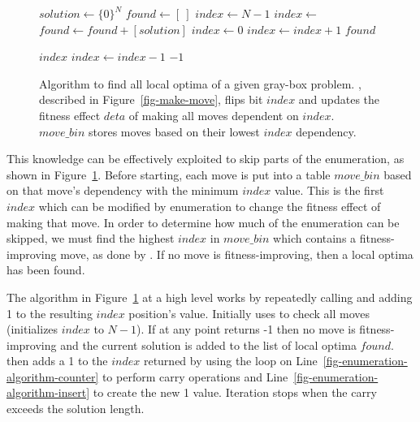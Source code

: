 \begin{figure}
  \begin{algorithmic}[1]
    \State $solution \leftarrow \{0\}^N$
    \State $found \leftarrow [~]$
    \State $index \leftarrow N-1$
      \State $index \leftarrow $
        \State $found \leftarrow found + [solution]$
        \State $index \leftarrow 0$
      \EndIf
      \label{fig-enumeration-algorithm-counter}
        \State {}
        \State $index \leftarrow index + 1$
      \EndWhile
        \State {}\label{fig-enumeration-algorithm-insert}
      \EndIf
    \EndWhile
    \State \Return $found$
  \EndProcedure

          \Return $index$
        \EndIf
      \EndFor
      \State $index \leftarrow index-1$
    \EndWhile
    \State \Return $-1$
  \EndProcedure
  \end{algorithmic}
  \caption{Algorithm to find all local optima of a given gray-box problem.
           , described in Figure~\ref{fig-make-move}, flips bit $index$
           and updates the fitness effect $deta$ of making all moves dependent on $index$.
           $move\_bin$ stores moves based on their lowest $index$ dependency.}
  \label{fig-enumerate-algorithm}
\end{figure}

This knowledge can be effectively exploited to skip parts of the enumeration,
as shown in Figure~\ref{fig-enumerate-algorithm}.
Before starting, each move is put into a table $move\_bin$
based on that move's dependency with the minimum $index$ value. This is the first $index$ which
can be modified by enumeration to change the fitness effect of making that move.
In order to determine how much of the enumeration can be skipped, we must find
the highest $index$ in $move\_bin$ which contains a fitness-improving move,
as done by . If no move is fitness-improving,
then a local optima has been found.

The  algorithm in Figure~\ref{fig-enumerate-algorithm} at a high level
works by repeatedly calling  and adding 1 to the resulting $index$ position's value.
Initially  uses  to check all moves (initializes $index$
to $N-1$). If at any point  returns -1 then no move is fitness-improving and
the current solution is added to the list of local optima $found$.  then
adds a 1 to the $index$ returned by  using the loop on Line~\ref{fig-enumeration-algorithm-counter}
to perform carry operations and Line~\ref{fig-enumeration-algorithm-insert} to create the new 1 value.
Iteration stops when the carry exceeds the solution length.

